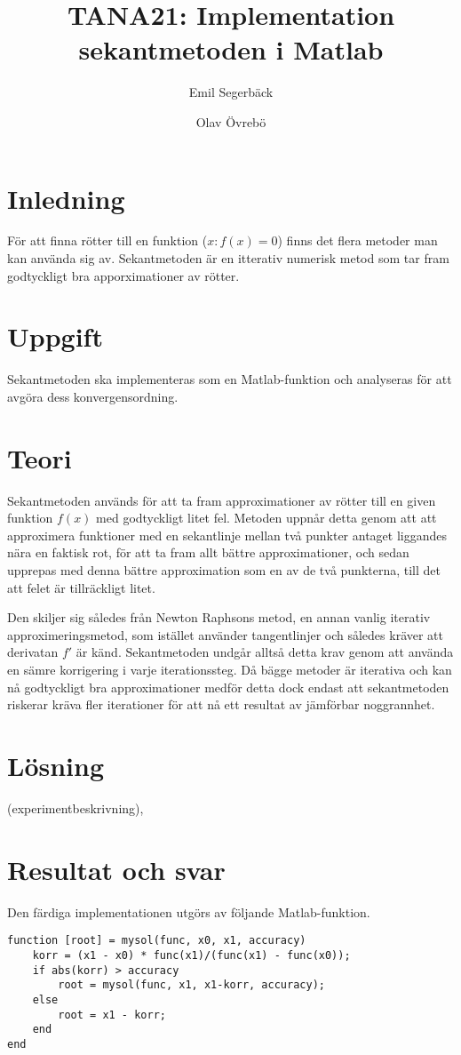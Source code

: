 \documentclass{article}
\title{TANA21: Implementation sekantmetoden i Matlab}
\author{Emil Segerbäck \and Olav Övrebö}
\begin{document}
\maketitle
\newpage

\section{Inledning}
För att finna rötter till en funktion ($x : f(x) = 0$) finns det flera metoder man kan använda sig av. Sekantmetoden är en itterativ numerisk metod som tar fram godtyckligt bra apporximationer av rötter.

\section{Uppgift}
Sekantmetoden ska implementeras som en Matlab-funktion och analyseras för att avgöra dess konvergensordning.

\section{Teori}
Sekantmetoden används för att ta fram approximationer av rötter till en given funktion $f(x)$ med godtyckligt litet fel. Metoden uppnår detta genom att att approximera funktioner med en sekantlinje mellan två punkter antaget liggandes nära en faktisk rot, för att ta fram allt bättre approximationer, och sedan upprepas med denna bättre approximation som en av de två punkterna, till det att felet är tillräckligt litet.

Den skiljer sig således från Newton Raphsons metod, en annan vanlig iterativ approximeringsmetod, som istället använder tangentlinjer och således kräver att derivatan $f'$ är känd. Sekantmetoden undgår alltså detta krav genom att använda en sämre korrigering i varje iterationssteg. Då bägge metoder är iterativa och kan nå godtyckligt bra approximationer medför detta dock endast att sekantmetoden riskerar kräva fler iterationer för att nå ett resultat av jämförbar noggrannhet.

\section{Lösning}
(experimentbeskrivning),

\section{Resultat och svar}
Den färdiga implementationen utgörs av följande Matlab-funktion.
\begin{lstlisting}
function [root] = mysol(func, x0, x1, accuracy)
    korr = (x1 - x0) * func(x1)/(func(x1) - func(x0));
    if abs(korr) > accuracy
        root = mysol(func, x1, x1-korr, accuracy);
    else
        root = x1 - korr;
    end
end
\end{lstlisting}
\end{document}
